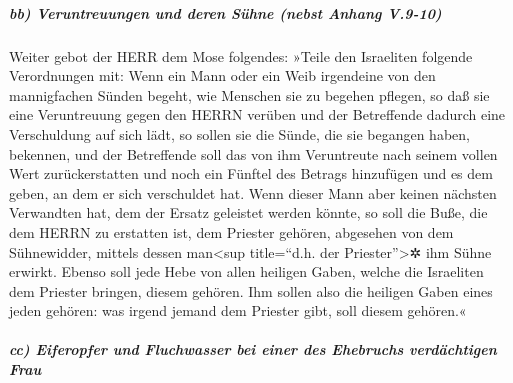 \hypertarget{bb-veruntreuungen-und-deren-suxfchne-nebst-anhang-v.9-10}{%
\subparagraph{bb) Veruntreuungen und deren Sühne (nebst Anhang
V.9-10)}\label{bb-veruntreuungen-und-deren-suxfchne-nebst-anhang-v.9-10}}

Weiter gebot der HERR dem Mose folgendes:
»Teile den Israeliten folgende Verordnungen mit: Wenn ein
Mann oder ein Weib irgendeine von den mannigfachen Sünden begeht, wie
Menschen sie zu begehen pflegen, so daß sie eine Veruntreuung gegen den
HERRN verüben und der Betreffende dadurch eine Verschuldung auf sich
lädt, so sollen sie die Sünde, die sie begangen haben,
bekennen, und der Betreffende soll das von ihm Veruntreute nach seinem
vollen Wert zurückerstatten und noch ein Fünftel des Betrags hinzufügen
und es dem geben, an dem er sich verschuldet hat. Wenn
dieser Mann aber keinen nächsten Verwandten hat, dem der Ersatz
geleistet werden könnte, so soll die Buße, die dem HERRN zu erstatten
ist, dem Priester gehören, abgesehen von dem Sühnewidder, mittels dessen
man\textless sup title=``d.h. der Priester''\textgreater✲ ihm Sühne
erwirkt. Ebenso soll jede Hebe von allen heiligen Gaben,
welche die Israeliten dem Priester bringen, diesem gehören.
Ihm sollen also die heiligen Gaben eines jeden gehören:
was irgend jemand dem Priester gibt, soll diesem gehören.«

\hypertarget{cc-eiferopfer-und-fluchwasser-bei-einer-des-ehebruchs-verduxe4chtigen-frau}{%
\subparagraph{cc) Eiferopfer und Fluchwasser bei einer des Ehebruchs
verdächtigen
Frau}\label{cc-eiferopfer-und-fluchwasser-bei-einer-des-ehebruchs-verduxe4chtigen-frau}}

